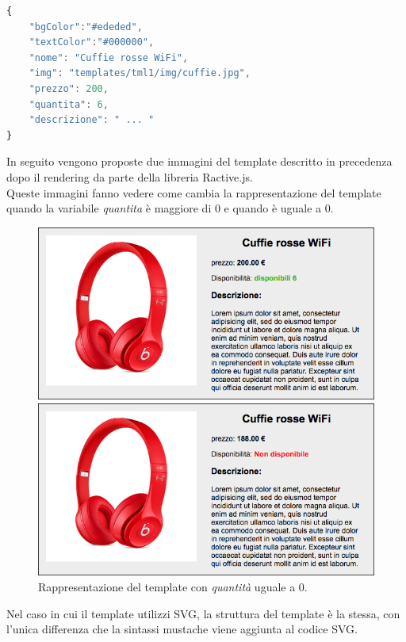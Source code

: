 \begin{lstlisting}[language=JavaScript, caption=Rappresentazione dell'oggetto JSON.]
{
	"bgColor":"#ededed",
	"textColor":"#000000",
	"nome": "Cuffie rosse WiFi",
	"img": "templates/tml1/img/cuffie.jpg",
	"prezzo": 200,
	"quantita": 6,
	"descrizione": " ... "
}
\end{lstlisting}

\newpage

In seguito vengono proposte due immagini del template descritto in precedenza dopo il rendering da parte della libreria Ractive.js.\\
Queste immagini fanno vedere come cambia la rappresentazione del template quando la variabile \textit{quantita} è maggiore di 0 e quando è uguale a 0.
\begin{figure}[htp]
	\centering
	\includegraphics[scale=0.4]{../immagini/screenshot_tml1_1}
	\caption{Rappresentazione del template con \textit{quantità} maggiore di 0.}
	\includegraphics[scale=0.4]{../immagini/screenshot_tml1_2}
	\caption{Rappresentazione del template con \textit{quantità} uguale a 0.}
\end{figure}

Nel caso in cui il template utilizzi SVG, la struttura del template è la stessa, con l'unica differenza che la sintassi mustache viene aggiunta al codice SVG.
